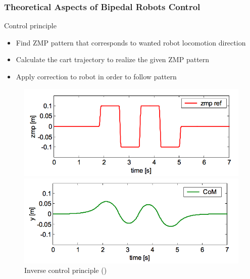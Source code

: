 \documentclass{beamer}
\begin{document}
\begin{frame}
	\frametitle{Theoretical Aspects of Bipedal Robots Control}
	\begin{block}{Control principle}
		\begin{itemize}
			\item
			Find ZMP pattern that corresponds to wanted robot locomotion direction
			\item
			Calculate the cart trajectory to realize the given ZMP pattern
			\item
			Apply correction to robot in order to follow pattern
		\end{itemize}
	\end{block}
	
	\begin{figure}[h!]
		\begin{minipage}[H]{0.45\linewidth}
			\centering
			\includegraphics[width=\linewidth]{presentation_images/13}
		\end{minipage}
		\hfill
		\begin{minipage}[H]{0.45\linewidth}
			\centering
			\includegraphics[width=\linewidth]{presentation_images/14}
		\end{minipage}
		
		\caption{Inverse control principle (\cite{kajita2003biped})}
	\end{figure}
\end{frame}

\end{document}
